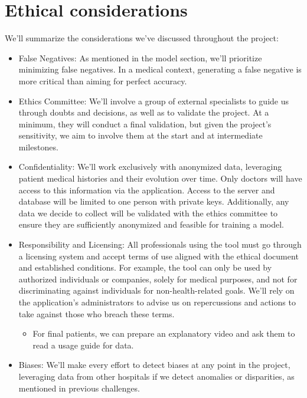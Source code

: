 \section{Ethical considerations}\label{sec:ethical-considerations}

We’ll summarize the considerations we’ve discussed throughout the project:

\begin{itemize}
    \item False Negatives: As mentioned in the model section, we’ll prioritize minimizing false negatives.
    In a medical context, generating a false negative is more critical than aiming for perfect accuracy.


    \item Ethics Committee: We’ll involve a group of external specialists to guide us through doubts and decisions,
    as well as to validate the project.
    At a minimum, they will conduct a final validation, but given the project’s sensitivity,
    we aim to involve them at the start and at intermediate milestones.


    \item Confidentiality: We’ll work exclusively with anonymized data,
    leveraging patient medical histories and their evolution over time.
    Only doctors will have access to this information via the application.
    Access to the server and database will be limited to one person with private keys.
    Additionally, any data we decide to collect will be validated with the ethics committee to ensure they are sufficiently anonymized and feasible for training a model.


    \item Responsibility and Licensing:
    All professionals using the tool must go through a licensing system and accept terms of use aligned with the ethical document and established conditions.
    For example, the tool can only be used by authorized individuals or companies, solely for medical purposes,
    and not for discriminating against individuals for non-health-related goals.
    We’ll rely on the application’s administrators to advise us on repercussions and actions to take against those who breach these terms.


    \begin{itemize}
        \item For final patients, we can prepare an explanatory video and ask them to read a usage guide for data.


    \end{itemize}
    \item Biases: We’ll make every effort to detect biases at any point in the project,
    leveraging data from other hospitals if we detect anomalies or disparities, as mentioned in previous challenges.



\end{itemize}
